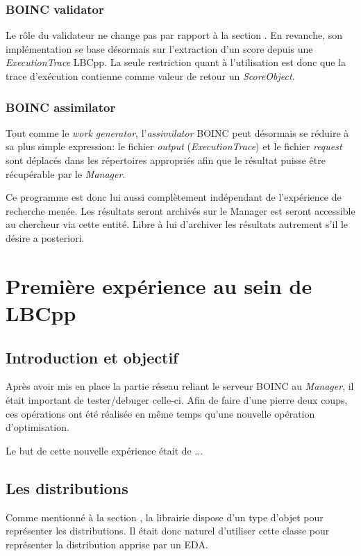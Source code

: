 \documentclass[a4paper, 11pt]{report}
\begin{document}
\subsubsection{BOINC validator}
Le rôle du validateur ne change pas par rapport à la section .%
En revanche, son implémentation se base désormais sur l'extraction d'un score depuis une \textit{ExecutionTrace} LBCpp. La seule restriction quant à l'utilisation est donc que la trace d'exécution contienne comme valeur de retour un \textit{ScoreObject}.

\subsubsection{BOINC assimilator}
Tout comme le \textit{work generator}, l'\textit{assimilator} \textsc{BOINC} peut désormais se réduire à sa plus simple expression: le fichier \textit{output} (\textit{ExecutionTrace}) et le fichier \textit{request} sont déplacés dans les répertoires appropriés afin que le résultat puisse être récupérable par le \textit{Manager}.

Ce programme est donc lui aussi complètement indépendant de l'expérience de recherche menée. Les résultats seront archivés sur le Manager est seront accessible au chercheur via cette entité. Libre à lui d'archiver les résultats autrement s'il le désire a posteriori. 


\section{Première expérience au sein de LBCpp}

\subsection{Introduction et objectif}
Après avoir mis en place la partie réseau reliant le serveur \textsc{BOINC} au \textit{Manager}, il était important de tester/debuger celle-ci. Afin de faire d'une pierre deux coups, ces opérations ont été réalisée en même temps qu'une nouvelle opération d'optimisation.

Le but de cette nouvelle expérience était de  ...

\subsection{Les distributions}
Comme mentionné à la section %
, la librairie dispose d'un type d'objet pour représenter les distributions. Il était donc naturel d'utiliser cette classe pour représenter la distribution apprise par un EDA. 
\end{document}
